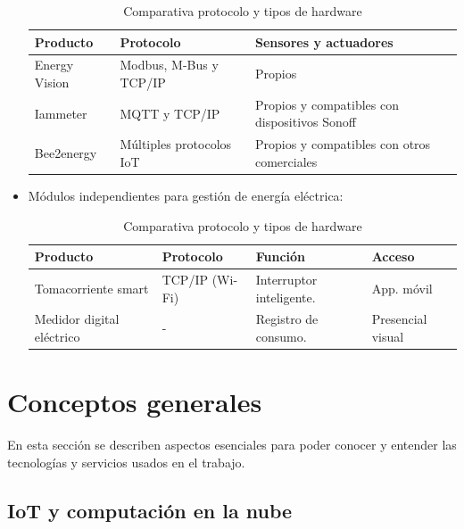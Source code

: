 \begin{itemize}
\begin{table}[h]
	\centering
	\caption[Comparativa de soluciones entre protocolo y hardware]{Comparativa protocolo y tipos de hardware}
	\begin{tabular}{l p{5cm} p{5cm}}    
		\toprule
		\textbf{Producto} 	 & \textbf{Protocolo}  & \textbf{Sensores y actuadores}  \\
		\midrule
		Energy Vision & Modbus, M-Bus  y TCP/IP 	& Propios \\		
		Iammeter	 & MQTT y TCP/IP	& Propios y compatibles con       dispositivos Sonoff   \\
		Bee2energy	 & Múltiples protocolos IoT		& Propios y compatibles con otros comerciales  \\
		\bottomrule
		\hline
	\end{tabular}
	\label{tab:tabla3}
\end{table}


\item Módulos independientes para gestión de energía eléctrica:


\begin{table}[h]
	\centering
	\caption[Comparativa de módulos entre protocolo y hardware]{Comparativa protocolo y tipos de hardware}
	\begin{tabular}{l p{2cm} p{3cm} p{2cm}}    
		\toprule
		\textbf{Producto} 	 & \textbf{Protocolo}  & \textbf{Función} & \textbf{Acceso} \\
		\midrule
		Tomacorriente smart & TCP/IP (Wi-Fi)	& Interruptor inteligente. & App. móvil  \\		
		Medidor digital eléctrico	 & -	& Registro de consumo.  & Presencial visual \\
		
		\bottomrule
		\hline
	\end{tabular}
	\label{tab:tabla4}
\end{table}



\end{itemize}

\section{Conceptos generales}

En esta sección se describen aspectos esenciales para poder conocer y entender las tecnologías y servicios usados en el trabajo.

\subsection{IoT y computación en la nube}

